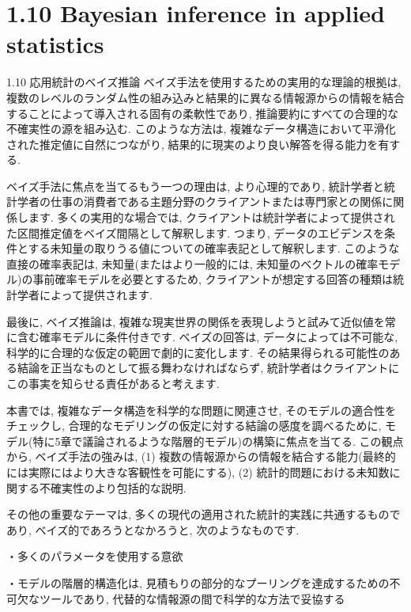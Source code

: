 \documentclass[10pt,dvipdfmx,a4]{beamer}
\begin{document}
\section{1.10 Bayesian inference in applied statistics}
\begin{frame}{1.10 応用統計のベイズ推論}
ベイズ手法を使用するための実用的な理論的根拠は, 複数のレベルのランダム性の組み込みと結果的に異なる情報源からの情報を結合することによって導入される固有の柔軟性であり, 推論要約にすべての合理的な不確実性の源を組み込む.
このような方法は, 複雑なデータ構造において平滑化された推定値に自然につながり, 結果的に現実のより良い解答を得る能力を有する.

ベイズ手法に焦点を当てるもう一つの理由は, より心理的であり, 統計学者と統計学者の仕事の消費者である主題分野のクライアントまたは専門家との関係に関係します.
多くの実用的な場合では, クライアントは統計学者によって提供された区間推定値をベイズ間隔として解釈します.
つまり, データのエビデンスを条件とする未知量の取りうる値についての確率表記として解釈します.
このような直接の確率表記は, 未知量(またはより一般的には, 未知量のベクトルの確率モデル)の事前確率モデルを必要とするため, クライアントが想定する回答の種類は統計学者によって提供されます.
\end{frame}


\begin{frame}
最後に, ベイズ推論は, 複雑な現実世界の関係を表現しようと試みて近似値を常に含む確率モデルに条件付きです.
ベイズの回答は, データによっては不可能な, 科学的に合理的な仮定の範囲で劇的に変化します.
その結果得られる可能性のある結論を正当なものとして振る舞わなければならず, 統計学者はクライアントにこの事実を知らせる責任があると考えます.

本書では, 複雑なデータ構造を科学的な問題に関連させ, そのモデルの適合性をチェックし, 合理的なモデリングの仮定に対する結論の感度を調べるために, モデル(特に5章で議論されるような階層的モデル)の構築に焦点を当てる.
この観点から, ベイズ手法の強みは, (1) 複数の情報源からの情報を結合する能力(最終的には実際にはより大きな客観性を可能にする), (2) 統計的問題における未知数に関する不確実性のより包括的な説明.

その他の重要なテーマは, 多くの現代の適用された統計的実践に共通するものであり, ベイズ的であろうとなかろうと, 次のようなものです.

・多くのパラメータを使用する意欲

・モデルの階層的構造化は, 見積もりの部分的なプーリングを達成するための不可欠なツールであり, 代替的な情報源の間で科学的な方法で妥協する
\end{frame}
\end{document}
